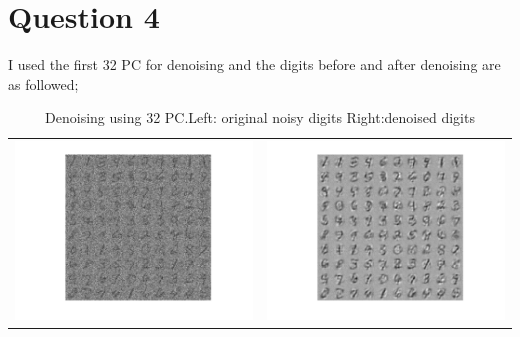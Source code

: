 \documentclass[paper=a4, fontsize=11pt]{scrartcl} %
\numberwithin{equation}{section} %
\numberwithin{figure}{section} %
\numberwithin{table}{section} %
\begin{document}

\section {Question 4}

I used the first 32 PC for denoising and the digits before and after denoising are as followed;

\begin{table}[H]
\caption{Denoising using 32 PC.\newline Left: original noisy digits \newline Right:denoised digits}
\centering
\begin{tabular}{cc}
    \includegraphics[scale=.4]{noisy_digits} &
    \includegraphics[scale=.4]{denoised_digits}
\end {tabular}
\end {table}
\end{document}
